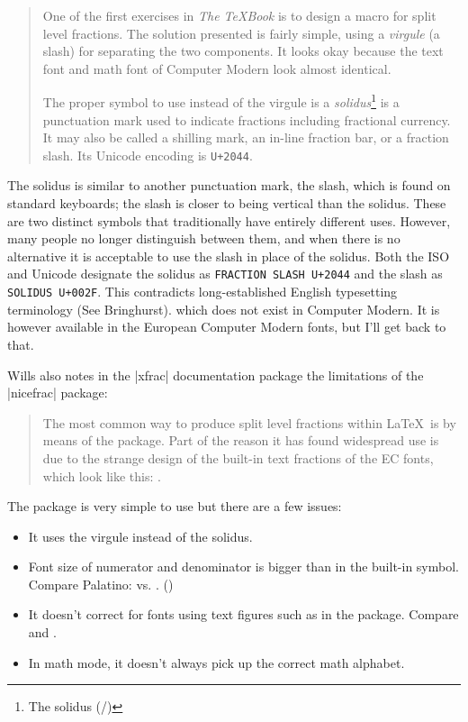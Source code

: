 \begin{quotation}
 One of the first exercises in \emph{The \TeX Book} is to design a
 macro for split level fractions. The solution presented is fairly
  simple, using a \emph{virgule} (a slash) for separating the two
  components. It looks okay because the text font and math font of
  Computer Modern look almost identical.

  The proper symbol to use instead of the virgule is a \emph{solidus}\footnote{The solidus (/)}  is a punctuation mark used to indicate fractions including fractional currency. It may also be called a shilling mark, an in-line fraction bar, or a fraction slash. Its Unicode encoding is \texttt{U+2044}.
\end{quotation}

The solidus is similar to another punctuation mark, the slash, which is found on standard keyboards; the slash is closer to being vertical than the solidus. These are two distinct symbols that traditionally have entirely different uses. However, many people no longer distinguish between them, and when there is no alternative it is acceptable to use the slash in place of the solidus.
Both the ISO and Unicode designate the solidus as \texttt{FRACTION SLASH U+2044} and the slash as \texttt{SOLIDUS U+002F}. This contradicts long-established English typesetting terminology (See Bringhurst).
  which does not exist in Computer Modern. It is however available in
  the European Computer Modern fonts, but I'll get back to that.

Wills also notes in the |xfrac| documentation package the limitations
of the |nicefrac| package:

\begin{quotation}
  The most common way to produce split level fractions within \LaTeX\
  is by means of the  package. Part of the reason it
  has found widespread use is due to the strange design of the
  built-in text fractions of the EC fonts, which look like this:
  \textonehalf. 
\end{quotation}

The package is very simple to use but there are a few
issues:

 \begin{itemize}
  \item It uses the virgule instead of the solidus.
  \item Font size of numerator and denominator is bigger than in the
    built-in symbol. Compare Palatino: \switch{ppl}{\nicefrac{1}{2}}
    vs. \switch{ppl}{\textonehalf }. (\sfrac{1}{2})

  \item It doesn't correct for fonts using text figures such as in the
    \docpkg{eco} package. Compare \switch{cmor}{\nicefrac{1}{2}} and
    \switch{cmor}{\nicefrac{8}{9}}.
  \item In math mode, it doesn't always pick up the correct math
    alphabet.
 \end{itemize}

